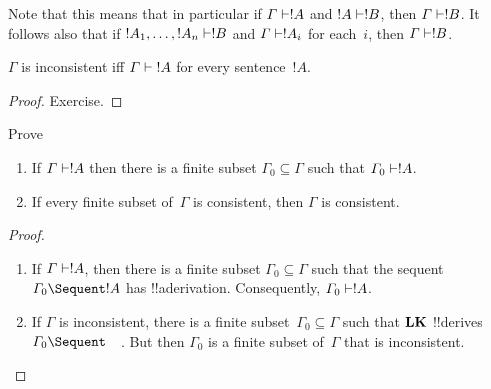 \documentclass[../../../include/open-logic-section]{subfiles}
\begin{document}
Note that this means that in particular if $\Gamma \Proves !A$ and $!A
\Proves !B$, then $\Gamma \Proves !B$. It follows also that if $!A_1,
\dots, !A_n \Proves !B$ and $\Gamma \Proves !A_i$ for each~$i$, then
$\Gamma \Proves !B$.

\begin{prop}
$\Gamma$ is inconsistent iff $\Gamma \Proves {!A}$ for every
  sentence~$!A$.
\end{prop}

\begin{proof}
Exercise.
\end{proof}

\begin{prob}
Prove 
\end{prob}

\begin{prop}[Compactness]
  \begin{enumerate}
  \item If $\Gamma \Proves !A$ then there is a finite subset $\Gamma_0
    \subseteq \Gamma$ such that $\Gamma_0 \Proves !A$.
  \item If every finite subset of~$\Gamma$ is
    consistent, then $\Gamma$ is consistent.
  \end{enumerate}
\end{prop}

\begin{proof}
  \begin{enumerate}
    \item If $\Gamma \Proves !A$, then there is a finite subset
      $\Gamma_0 \subseteq \Gamma$ such that the sequent $\Gamma_0
      \Sequent !A$ has !!a{derivation}. Consequently, $\Gamma_0
      \Proves !A$.
    \item If $\Gamma$ is inconsistent, there is a finite
      subset~$\Gamma_0 \subseteq \Gamma$ such that $\Log{LK}$
      !!{derive}s $\Gamma_0 \Sequent \quad$. But then $\Gamma_0$ is a
      finite subset of~$\Gamma$ that is inconsistent.
  \end{enumerate}
\end{proof}
\end{document}

